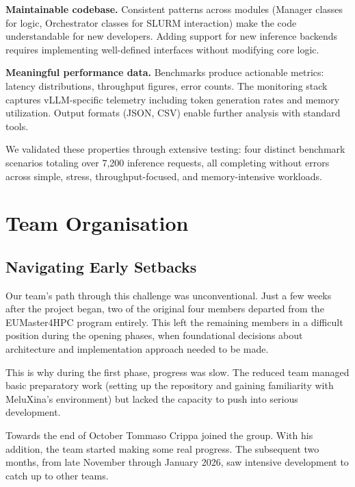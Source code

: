 \documentclass[12pt,a4paper]{article}
\begin{document}
\textbf{Maintainable codebase.} Consistent patterns across modules (Manager classes for logic, Orchestrator classes for SLURM interaction) make the code understandable for new developers. Adding support for new inference backends requires implementing well-defined interfaces without modifying core logic.


\textbf{Meaningful performance data.} Benchmarks produce actionable metrics: latency distributions, throughput figures, error counts. The monitoring stack captures vLLM-specific telemetry including token generation rates and memory utilization. Output formats (JSON, CSV) enable further analysis with standard tools.



We validated these properties through extensive testing: four distinct benchmark scenarios totaling over 7,200 inference requests, all completing without errors across simple, stress, throughput-focused, and memory-intensive workloads.

\section{Team Organisation}

\subsection{Navigating Early Setbacks}

Our team's path through this challenge was unconventional. Just a few weeks after the project began, two of the original four members departed from the EUMaster4HPC program entirely. This left the remaining members in a difficult position during the opening phases, when foundational decisions about architecture and implementation approach needed to be made.

This is why during the first phase, progress was slow. The reduced team managed basic preparatory work (setting up the repository and gaining familiarity with MeluXina's environment) but lacked the capacity to push into serious development.

Towards the end of October Tommaso Crippa joined the group. With his addition, the team started making some real progress. The subsequent two months, from late November through January 2026, saw intensive development to catch up to other teams. 
\end{document}
